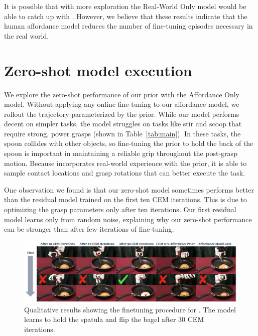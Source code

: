It is possible that with more exploration the Real-World Only model would be able to catch up with \ours. However, we believe that these results indicate that the human affordance model reduces the number of fine-tuning episodes necessary in the real world.

\section{Zero-shot model execution} 
We explore the zero-shot performance of our prior with the Affordance Only model.  Without applying any online fine-tuning to our affordance model, we rollout the trajectory parameterized by the prior.  While our model performs decent on simpler tasks, the model struggles on tasks like stir and scoop that require strong, power grasps (shown in Table~\ref{tab:main}). In these tasks, the spoon collides with other objects, so fine-tuning the prior to hold the back of the spoon is important in maintaining a reliable grip throughout the post-grasp motion. Because \ours incorporates real-world experience with the prior, it is able to sample contact locations and grasp rotations that can better execute the task. 

One observation we found is that our zero-shot model sometimes performs better than the residual model trained on the first ten CEM iterations. This is due to \ours optimizing the grasp parameters only after ten iterations. Our first residual model learns only from random noise, explaining why our zero-shot performance can be stronger than \ours after few iterations of fine-tuning.


\begin{figure}[t]
\centering
\includegraphics[width=\linewidth]{figs/qual_results.pdf}
\vspace{-0.2in}
  \caption{\small Qualitative results showing the finetuning procedure for \ours.  The model learns to hold the spatula and flip the bagel after 30 CEM iterations. }
 \label{fig:task_bagel}
 \vspace{-0.15in}
\end{figure}



